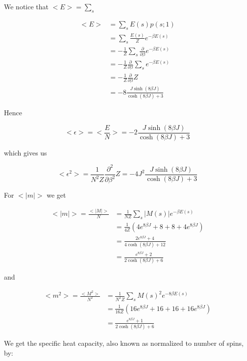 \documentclass[english,notitlepage,reprint,nofootinbib]{revtex4-1}  %
\begin{document}
We notice that $<E> = \sum\limits_{s}$

\begin{align*}
    <E> &= \sum\limits_{s} E(s) p(s;1)\\
    &= \sum\limits_{s} \frac{E(s)}{Z} e^{- \beta E(s)} \\
    &= - \frac{1}{Z} \sum\limits_{s} \frac{\partial}{\partial \beta} e^{- \beta E(s)} \\
    &= - \frac{1}{Z} \frac{\partial}{\partial \beta} \sum\limits_{s} e^{- \beta E(s)} \\
    &= - \frac{1}{Z} \frac{\partial}{\partial \beta} Z \\
    &= -8 \frac{J \sinh (8 \beta J)}{\cosh (8 \beta J) + 3}
\end{align*}

Hence

\begin{equation}
    <\epsilon> = <\frac{E}{N}> = -2 \frac{J \sinh (8 \beta J)}{\cosh (8 \beta J) + 3}
\end{equation}

which gives us

\begin{equation}
    <\epsilon^2> = \frac{1}{N^2 Z} \frac{\partial^2}{\partial \beta^2} Z = -4 J^2 \frac{J \sinh (8 \beta J)}{\cosh (8 \beta J) + 3}
\end{equation}

For $<|m|>$ we get

\begin{align*}
    <|m|> = \frac{<|M|>}{N} &= \frac{1}{N Z} \sum\limits_{s} |M(s)| e^{- \beta E(s)} \\
    &= \frac{1}{4 Z} \left( 4 e^{8 \beta J} + 8 + 8 + 4 e^{8 \beta J} \right) \\
    &= \frac{2 e^{8 \beta J}  + 4}{4 \cosh (8 \beta J) + 12} \\
    &= \frac{e^{8 \beta J}  + 2}{2 \cosh (8 \beta J) + 6}
\end{align*}

and 

\begin{align*}
    <m^2> = \frac{<M^2>}{N^2} &= \frac{1}{N^2 Z} \sum\limits_{s} M(s)^2 e^{-8 \beta E(s)} \\
    &= \frac{1}{16 Z} \left( 16 e^{8 \beta J} + 16 + 16 + 16 e^{8 \beta J} \right) \\
    &= \frac{e^{8 \beta J}  + 1}{2 \cosh (8 \beta J) + 6}
\end{align*}

We get the specific heat capacity, also known as normalized to number of spins, by:
\end{document}
